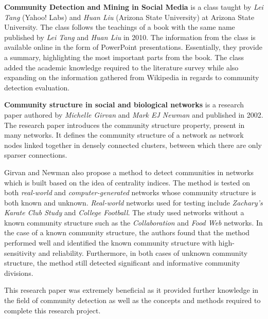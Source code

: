 \vspace*{1em}

\textbf{Community Detection and Mining in Social Media} \cite{community_detection_class} is a class taught by \textit{Lei Tang} (Yahoo! Labs) and \textit{Huan Liu} (Arizona State University) at Arizona State University. The class follows the teachings of a book with the same name \cite{tang2010community} published by \textit{Lei Tang} and \textit{Huan Liu} in 2010. The information from the class is available online in the form of PowerPoint presentations. Essentially, they provide a summary, highlighting the most important parts from the book. The class added the academic knowledge required to the literature survey while also expanding on the information gathered from Wikipedia in regards to community detection evaluation.

\vspace*{1em}

\textbf{Community structure in social and biological networks} \cite{girvan2002community} is a research paper authored by \textit{Michelle Girvan} and \textit{Mark EJ Newman} and published in 2002. The research paper introduces the community structure property, present in many networks. It defines the community structure of a network as network nodes linked together in densely connected clusters, between which there are only sparser connections.

Girvan and Newman also propose a method to detect communities in networks which is built based on the idea of centrality indices. The method is tested on both \textit{real-world} and \textit{computer-generated} networks whose community structure is both known and unknown. \textit{Real-world} networks used for testing include \textit{Zachary's Karate Club Study} and \textit{College Football}. The study used networks without a known community structure such as the \textit{Collaboration} and \textit{Food Web} networks. In the case of a known community structure, the authors found that the method performed well and identified the known community structure with high-sensitivity and reliability. Furthermore, in both cases of unknown community structure, the method still detected significant and informative community divisions.

This research paper was extremely beneficial as it provided further knowledge in the field of community detection as well as the concepts and methods required to complete this research project.

\vspace*{1em}

